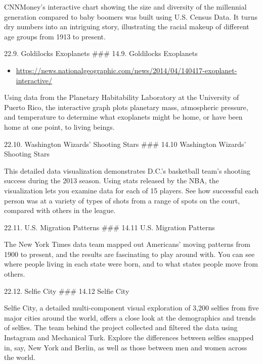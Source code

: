\documentclass[]{book}
\providecommand{\tightlist}{%
  \setlength{\itemsep}{0pt}\setlength{\parskip}{0pt}}
\theoremstyle{definition}
\theoremstyle{definition}
\theoremstyle{definition}
\theoremstyle{remark}
\begin{document}
CNNMoney's interactive chart showing the size and diversity of the
millennial generation compared to baby boomers was built using U.S.
Census Data. It turns dry numbers into an intriguing story, illustrating
the racial makeup of different age groups from 1913 to present.

22.9. Goldilocks Exoplanets \#\#\# 14.9. Goldilocks Exoplanets

\begin{itemize}
\tightlist
\item
  \url{https://news.nationalgeographic.com/news/2014/04/140417-exoplanet-interactive/}
\end{itemize}

Using data from the Planetary Habitability Laboratory at the University
of Puerto Rico, the interactive graph plots planetary mass, atmospheric
pressure, and temperature to determine what exoplanets might be home, or
have been home at one point, to living beings.

22.10. Washington Wizards' Shooting Stars \#\#\# 14.10 Washington
Wizards' Shooting Stars

\citep{basketball}

This detailed data visualization demonstrates D.C.'s basketball team's
shooting success during the 2013 season. Using stats released by the
NBA, the visualization lets you examine data for each of 15 players. See
how successful each person was at a variety of types of shots from a
range of spots on the court, compared with others in the league.

22.11. U.S. Migration Patterns \#\#\# 14.11 U.S. Migration Patterns

\citep{migration}

The New York Times data team mapped out Americans' moving patterns from
1900 to present, and the results are fascinating to play around with.
You can see where people living in each state were born, and to what
states people move from others.

22.12. Selfie City \#\#\# 14.12 Selfie City

\citep{selfie}

Selfie City, a detailed multi-component visual exploration of 3,200
selfies from five major cities around the world, offers a close look at
the demographics and trends of selfies. The team behind the project
collected and filtered the data using Instagram and Mechanical Turk.
Explore the differences between selfies snapped in, say, New York and
Berlin, as well as those between men and women across the world.
\end{document}
